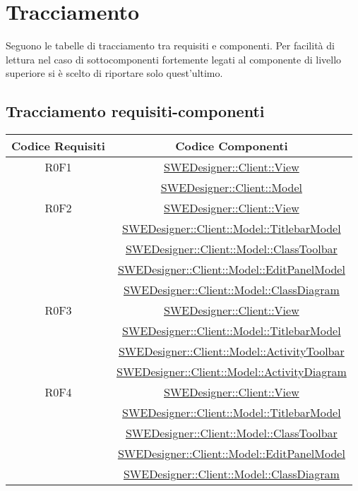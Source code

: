 \documentclass[../SpecificaTecnica.tex]{subfiles}
\begin{document}
	\section{Tracciamento}
	Seguono le tabelle di tracciamento tra requisiti e componenti.
	Per facilità di lettura nel caso di sottocomponenti fortemente legati al componente di livello superiore si è scelto di riportare solo quest'ultimo.
		
	\subsection{Tracciamento requisiti-componenti}
	\normalsize
	\begin{longtable}{|c|c|}
		\hline
		\textbf{Codice Requisiti} & \textbf{Codice Componenti} \\
		\hline
		\endhead
		R0F1 & \hyperlink{SWEDesigner::Client::View}{SWEDesigner::Client::View}
		\\& \hyperlink{SWEDesigner::Client::Model}{SWEDesigner::Client::Model}\\\hline
		R0F2 & \hyperlink{SWEDesigner::Client::View}{SWEDesigner::Client::View} \\& \hyperlink{SWEDesigner::Client::Model::TitlebarModel}{SWEDesigner::Client::Model::TitlebarModel} \\& \hyperlink{SWEDesigner::Client::Model::ClassToolbar}{SWEDesigner::Client::Model::ClassToolbar} \\& \hyperlink{SWEDesigner::Client::Model::EditPanelModel}{SWEDesigner::Client::Model::EditPanelModel} \\& \hyperlink{SWEDesigner::Client::Model::ClassDiagram}{SWEDesigner::Client::Model::ClassDiagram} \\\hline
		R0F3 & \hyperlink{SWEDesigner::Client::View}{SWEDesigner::Client::View} \\& \hyperlink{SWEDesigner::Client::Model::TitlebarModel}{SWEDesigner::Client::Model::TitlebarModel} \\& \hyperlink{SWEDesigner::Client::Model::ActivityToolbar}{SWEDesigner::Client::Model::ActivityToolbar} \\& \hyperlink{SWEDesigner::Client::Model::ActivityDiagram}{SWEDesigner::Client::Model::ActivityDiagram} \\\hline
		R0F4 & \hyperlink{SWEDesigner::Client::View}{SWEDesigner::Client::View} \\& \hyperlink{SWEDesigner::Client::Model::TitlebarModel}{SWEDesigner::Client::Model::TitlebarModel} \\& \hyperlink{SWEDesigner::Client::Model::ClassToolbar}{SWEDesigner::Client::Model::ClassToolbar} \\& \hyperlink{SWEDesigner::Client::Model::EditPanelModel}{SWEDesigner::Client::Model::EditPanelModel} \\& \hyperlink{SWEDesigner::Client::Model::ClassDiagram}{SWEDesigner::Client::Model::ClassDiagram} \\\hline

\end{longtable}
\end{document}
